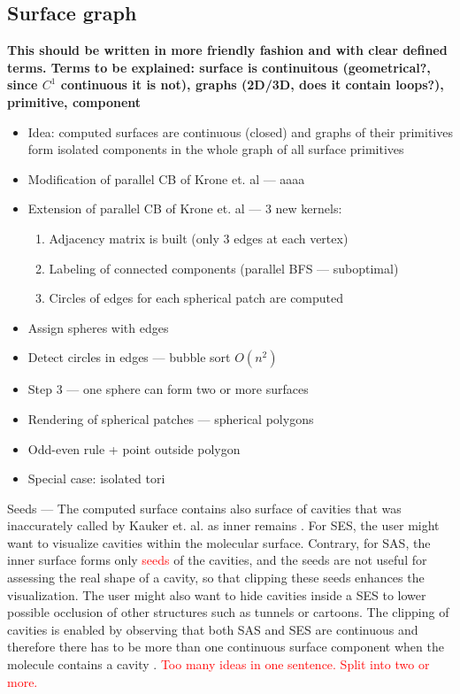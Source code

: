 \subsection{Surface graph}
\textbf{This should be written in more friendly fashion and with clear defined terms.
Terms to be explained: surface is continuitous (geometrical?, since $C^1$ continuous it is not), graphs (2D/3D, does it contain loops?), primitive, component }   
\begin{itemize}
  \item Idea: computed surfaces are continuous (closed) and graphs of their primitives form isolated components in the whole graph of all surface primitives
  \item Modification of parallel CB of Krone et. al --- aaaa
  \item Extension of parallel CB of Krone et. al --- 3 new kernels:
	\begin{enumerate}
	  \item Adjacency matrix is built (only 3 edges at each vertex)
    \item Labeling of connected components (parallel BFS --- suboptimal)
    \item Circles of edges for each spherical patch are computed
  \end{enumerate}
  \item Assign spheres with edges
  \item Detect circles in edges --- bubble sort $O(n^2)$
  \item Step 3 --- one sphere can form two or more surfaces
  \item Rendering of spherical patches --- spherical polygons
  \item Odd-even rule + point outside polygon
  \item Special case: isolated tori
\end{itemize}

Seeds --- The computed surface contains also surface of cavities that was inaccurately called by Kauker et. al. as inner remains \cite{kauker2013rendering}.
For SES, the user might want to visualize cavities within the molecular surface.
Contrary, for SAS, the inner surface forms only \textcolor{red}{seeds} of the cavities, and the seeds are not useful for assessing the real shape of a cavity, so that clipping these seeds enhances the visualization.
The user might also want to hide cavities inside a SES to lower possible occlusion of other structures such as tunnels or cartoons.
The clipping of cavities is enabled by observing that both SAS and SES are continuous and therefore there has to be more than one continuous surface component when the molecule contains a cavity \cite{borland2011ambient}.
\textcolor{red}{Too many ideas in one sentence. Split into two or more.}


